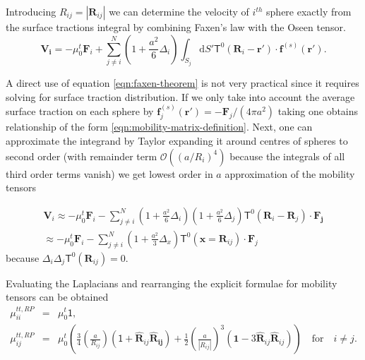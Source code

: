 \documentclass{doctoral}
\newcommand{\dd}{\mathrm{d}}
\newcommand{\mm}[1]{\bm{\mathsf{#1}}} %
\begin{document}
Introducing $R_{ij} = |\bm{R}_{ij}|$ we can determine the velocity of $i^{th}$ sphere exactly from the surface tractions integral by combining Faxen's law \cite{Faxen_1922} with the Oseen tensor.
\begin{equation}
    \bm{V_i} =
    -\mu_0^t \bm{F}_i
    + \sum_{j\neq i}^N
    (1 + \frac{a^2}{6} \Delta_i)
    \int_{S_j} \dd S' \mm{T}^0(\bm{R}_i-\bm{r'})\cdot \bm{f}^{(s)}(\bm{r'}).
    \label{eqn:faxen-theorem}
\end{equation}

A direct use of equation \eqref{eqn:faxen-theorem} is not very practical since it requires solving for surface traction distribution.
If we only take into account the average surface traction on each sphere  by $\bm{f}_j^{(s)}(\bm{r'}) = -\bm{F}_j / (4\pi a^2)$ taking one obtains relationship of the form \eqref{eqn:mobility-matrix-definition}.
Next, one can approximate the integrand by Taylor expanding it around centres of spheres to second order (with remainder term $\mathcal{O}((a/R_i)^4)$ because the integrals of all third order terms vanish) we get lowest order in $a$ approximation of the mobility tensors 

\begin{eqnarray}
    \bm{V}_i \approx -\mu_0^t \bm{F}_i  - \sum_{j\neq i}^N (1 + \frac{a^2}{6} \Delta_i) (1 + \frac{a^2}{6} \Delta_j) \mm{T}^{0} (\bm{R}_i - \bm{R}_j) \cdot \bm{F_j} \\
    \approx -\mu_0^t \bm{F}_i  - \sum_{j\neq i}^N (1 + \frac{a^2}{3} \Delta_x) \mm{T}^{0} (\bm{x} = \bm{R}_{ij}) \cdot \bm{F}_j \label{eqn:rotne-prager-derivation}
\end{eqnarray}
because $\Delta_i \Delta_j \mm{T}^0(\bm{R}_{ij}) = 0$.

Evaluating the Laplacians and rearranging the explicit formulae for mobility tensors can be obtained
\begin{eqnarray}
    \mm{\mu}_{ii}^{tt,RP} & = & \mu_0^t \mm{1},                                                                                                                                                                                                                                                                  \\
    \mm{\mu}_{ij}^{tt,RP} & = & \mu_0^t \left( \frac{3}{4} \left( \frac{a}{R_{ij}} \right) \left( \mm{1} + \bm{\hat{R}}_{ij} \bm{\hat{R}_{ij}} \right) + \frac{1}{2} \left( \frac{a}{|R_{ij}|} \right)^3 \left( \bm{1} -3  \bm{\hat{R}}_{ij}\bm{\hat{R}}_{ij} \right) \right) \quad \mathrm{for} \quad i \neq j.
    \label{eqn:rotne-prager-translation}
\end{eqnarray}
\end{document}
